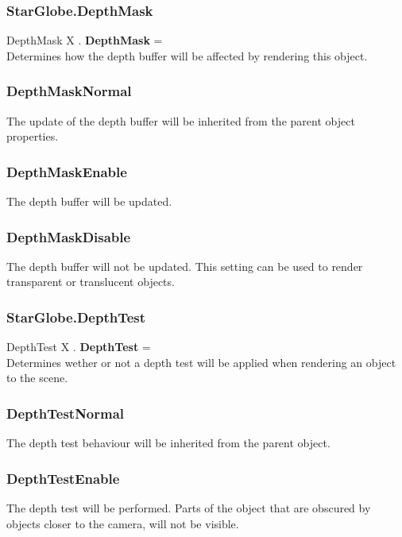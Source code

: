 \documentclass[10pt]{book}
\begin{document}
\subsubsection{StarGlobe.DepthMask \label{F:StarGlobe:DepthMask}}
DepthMask X . \textbf{DepthMask} = \\
Determines how the depth buffer will be affected by rendering this object.

\subsubsection{DepthMaskNormal \label{T:DepthMask|DepthMaskNormal}}
The update of the depth buffer will be inherited from the parent object properties.

\subsubsection{DepthMaskEnable \label{T:DepthMask|DepthMaskEnable}}
The depth buffer will be updated.

\subsubsection{DepthMaskDisable \label{T:DepthMask|DepthMaskDisable}}
The depth buffer will not be updated. This setting can be used to render transparent or translucent objects.

\subsubsection{StarGlobe.DepthTest \label{F:StarGlobe:DepthTest}}
DepthTest X . \textbf{DepthTest} = \\
Determines wether or not a depth test will be applied when rendering an object to the scene.

\subsubsection{DepthTestNormal \label{T:DepthTest|DepthTestNormal}}
The depth test behaviour will be inherited from the parent object.

\subsubsection{DepthTestEnable \label{T:DepthTest|DepthTestEnable}}
The depth test will be performed. Parts of the object that are obscured by objects closer to the camera, will not be visible.
\end{document}
